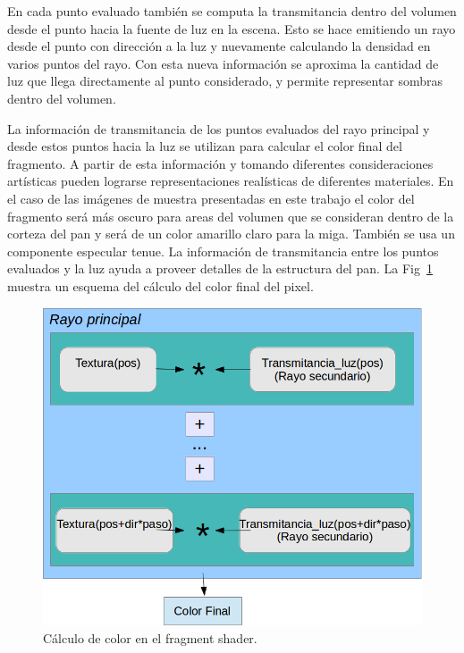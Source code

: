 \documentclass[oneside,a4paper,spanish,links]{amca}
\begin{document}
En cada punto evaluado también se computa la transmitancia dentro del
volumen desde el punto hacia la fuente de luz en la escena. Esto se
hace emitiendo un rayo desde el punto con dirección a la luz
y nuevamente calculando la densidad en varios puntos del rayo. Con esta
nueva información se aproxima la cantidad de luz que llega
directamente al punto considerado, y permite representar sombras dentro
del volumen.

La información de transmitancia de los puntos evaluados del rayo
principal y desde estos puntos hacia la luz se
utilizan para calcular el color final del fragmento. A partir de
esta información y tomando diferentes consideraciones artísticas
pueden lograrse representaciones realísticas de diferentes
materiales. En el caso de las imágenes de muestra presentadas en este
trabajo el color del fragmento será más oscuro para areas del volumen
que se consideran dentro de la corteza del pan y será de un color
amarillo claro para la miga. También se usa un componente especular
tenue. La información de transmitancia entre los puntos evaluados y la
luz ayuda a proveer detalles de la estructura del pan. La Fig~\ref{fg:fragmentshader} muestra un esquema del cálculo del color final del pixel.

\begin{figure}[htb!]
  \centerline{\includegraphics[scale=0.4]{fragmentshader}}
  \caption{Cálculo de color en el fragment shader. }
  \label{fg:fragmentshader}
\end{figure}
\end{document}

